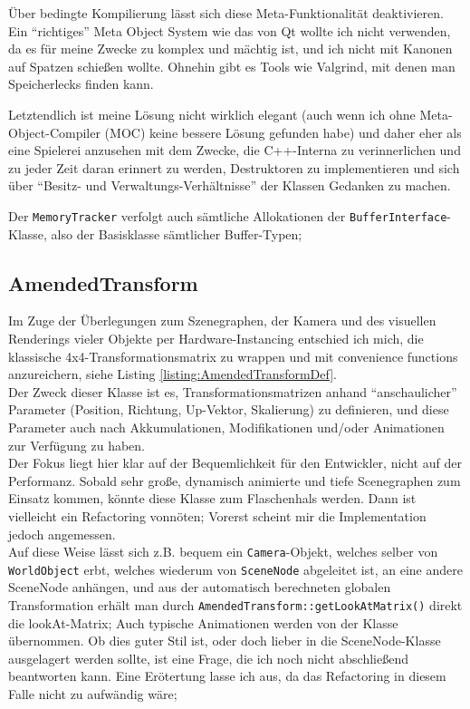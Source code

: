 	Über bedingte Kompilierung lässt sich diese Meta-Funktionalität deaktivieren.
	Ein "`richtiges"' Meta Object System wie das von Qt wollte ich nicht verwenden, da es für meine Zwecke zu komplex und
	mächtig ist, und ich nicht mit Kanonen auf Spatzen schießen wollte. Ohnehin gibt es Tools wie Valgrind, mit denen
	man Speicherlecks finden kann. 

	Letztendlich ist meine Lösung nicht wirklich elegant (auch wenn ich ohne Meta-Object-Compiler (MOC) keine bessere 	
	Lösung gefunden habe) und daher eher als eine Spielerei anzusehen
	mit dem Zwecke, die C++-Interna zu verinnerlichen und zu jeder Zeit daran erinnert zu werden, 
	Destruktoren zu implementieren und sich über 
	"`Besitz- und Verwaltungs-Verhältnisse"' der Klassen Gedanken zu machen.
	
	Der \lstinline|MemoryTracker| verfolgt auch sämtliche Allokationen der \lstinline|BufferInterface|-Klasse,
	also der Basisklasse sämtlicher Buffer-Typen;
	
\subsection{AmendedTransform}
 	Im Zuge der Überlegungen zum Szenegraphen, der Kamera und des visuellen Renderings vieler Objekte per
 	Hardware-Instancing entschied ich mich, die klassische 4x4-Transformationsmatrix zu wrappen und mit
 	convenience functions anzureichern, siehe Listing \ref{listing:AmendedTransformDef}.\\
 	Der Zweck dieser Klasse ist es, Transformationsmatrizen anhand "`anschaulicher"' Parameter 
 	(Position, Richtung, Up-Vektor, Skalierung) zu definieren,
 	und diese Parameter auch nach Akkumulationen, Modifikationen und/oder Animationen zur Verfügung zu haben.\\
 	Der Fokus liegt hier klar auf der Bequemlichkeit für den Entwickler, nicht auf der Performanz.
 	Sobald sehr große, dynamisch animierte und tiefe Scenegraphen zum Einsatz kommen, könnte diese Klasse
 	zum Flaschenhals werden. Dann ist vielleicht ein Refactoring vonnöten; Vorerst scheint mir die Implementation jedoch
 	angemessen.\\
 	
 	Auf diese Weise lässt sich z.B. bequem ein \lstinline|Camera|-Objekt, welches selber von \lstinline|WorldObject| erbt,
 	welches wiederum von \lstinline|SceneNode| abgeleitet ist, an eine andere SceneNode anhängen, und aus der automatisch
 	berechneten globalen Transformation erhält man durch \lstinline|AmendedTransform::getLookAtMatrix()|
 	direkt die lookAt-Matrix;
 	Auch typische Animationen werden von der Klasse übernommen. Ob dies guter Stil ist, oder doch lieber in die
 	SceneNode-Klasse ausgelagert werden sollte, ist eine Frage, die ich noch nicht abschließend beantworten kann.
 	Eine Erötertung lasse ich aus, da das Refactoring in diesem Falle nicht zu aufwändig wäre;


